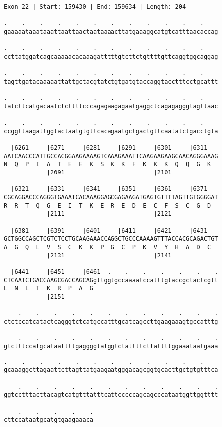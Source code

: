 \documentclass{article}
\begin{document}
\begin{Verbatim}[fontfamily=courier]
Exon 22 | Start: 159430 | End: 159634 | Length: 204

.    .    .    .    .    .    .    .    .    .    .    .    
gaaaaataaataaattaattaactaataaaacttatgaaaggcatgtcatttaacaccag

.    .    .    .    .    .    .    .    .    .    .    .    
ccttatggatcagcaaaaacacaaagatttttgtcttctgttttgttcaggtggcaggag

.    .    .    .    .    .    .    .    .    .    .    .    
tagttgatacaaaaattattgctacgtatctgtgatgtaccaggtacctttcctgcattt

.    .    .    .    .    .    .    .    .    .    .    .    
tatcttcatgacaatctcttttcccagagaagagaatgaggctcagagagggtagttaac

.    .    .    .    .    .    .    .    .    .    .    .    
ccggttaagattggtactaatgtgttcacagaatgctgactgttcaatatctgacctgta

  |6261     |6271     |6281     |6291     |6301     |6311   
AATCAACCCATTGCCACGGAAGAAAAGTCAAAGAAATTCAAGAAGAAGCAACAGGGAAAG
N  Q  P  I  A  T  E  E  K  S  K  K  F  K  K  K  Q  Q  G  K  
            |2091                         |2101             

  |6321     |6331     |6341     |6351     |6361     |6371   
CGCAGGACCCAGGGTGAAATCACAAAGGAGCGAGAAGATGAGTGTTTTAGTTGTGGGGAT
R  R  T  Q  G  E  I  T  K  E  R  E  D  E  C  F  S  C  G  D  
            |2111                         |2121             

  |6381     |6391     |6401     |6411     |6421     |6431   
GCTGGCCAGCTCGTCTCCTGCAAGAAACCAGGCTGCCCAAAAGTTTACCACGCAGACTGT
A  G  Q  L  V  S  C  K  K  P  G  C  P  K  V  Y  H  A  D  C  
            |2131                         |2141             

  |6441     |6451     |6461  .    .    .    .    .    .    .
CTCAATCTGACCAAGCGACCAGCAGgttggtgccaaaatccatttgtaccgctactcgtt
L  N  L  T  K  R  P  A  G                                   
            |2151                                           

    .    .    .    .    .    .    .    .    .    .    .    .
ctctccatcatactcagggtctcatgccatttgcatcagccttgaagaaagtgccatttg

    .    .    .    .    .    .    .    .    .    .    .    .
gtctttccatgcataattttgaggggtatggtctattttcttattttggaaataatgaaa

\end{Verbatim}
\newpage
\begin{Verbatim}[fontfamily=courier]
    .    .    .    .    .    .    .    .    .    .    .    .
gcaaaggcttagaattcttagttatgaagaatgggacagcggtgcacttgctgtgtttca

    .    .    .    .    .    .    .    .    .    .    .    .
ggtcctttacttacagtcatgtttatttcattcccccagcagcccataatggttggtttt

    .    .    .    .    .
cttccataatgcatgtgaagaaaca
\end{Verbatim}
\end{document}
